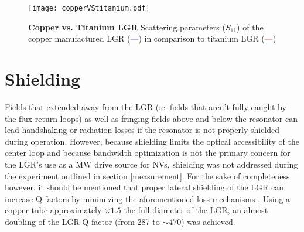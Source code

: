 \begin{figure}[t!]
\centering
\texttt{[image: copperVStitanium.pdf]}  
\caption{\textbf{Copper vs. Titanium LGR} Scattering parameters ($S_{11}$) of the copper manufactured LGR (\textcolor{blue}{---}) in comparison to titanium LGR (\textcolor{red}{---})}
\label{LGR_Coppervstit}
\end{figure} 

\section{Shielding}  

Fields that extended away from the LGR (ie. fields that aren't fully caught by the flux return loops) as well as fringing fields above and below the resonator can lead handshaking or radiation losses if the resonator is not properly shielded during operation. However, because shielding limits the optical accessibility of the center loop and because bandwidth optimization is not the primary concern for the LGR's use as a MW drive source for NVs, shielding was not addressed during the experiment outlined in section \ref{measurement}. For the sake of completeness however, it should be mentioned that proper lateral shielding of the LGR can increase Q factors by minimizing the aforementioned loss mechanisms \cite{petryakov2001bridged, rinard2005loopgap}. Using a copper tube approximately $\times 1.5$ the full diameter of the LGR, an almost doubling of the LGR Q factor (from 287 to $\sim 470$) was achieved.  

\clearpage
\newpage
